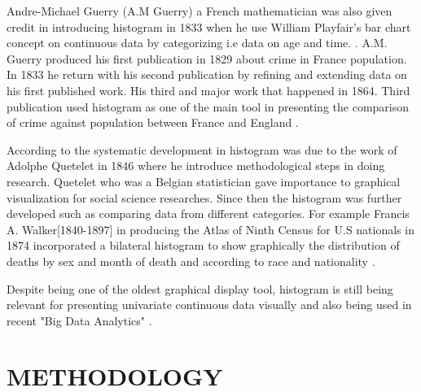 Andre-Michael Guerry (A.M Guerry) a French mathematician was also given credit in introducing histogram in 1833 when he use William Playfair's bar chart concept on continuous data by categorizing i.e data on age and time. \cite[]{beniger1976history,friendly2007m,ross2010introductory}. A.M. Guerry produced his first publication in 1829 about crime in France population. In 1833 he return with his second publication by refining and extending data on his first published work. His third and major work that happened in 1864. Third publication used histogram as one of the main tool in presenting the comparison of crime against population between France and England \cite[]{friendly2007m}.

According to \cite[]{ross2010introductory} the systematic development in histogram was due to the work of Adolphe Quetelet in 1846 where he introduce methodological steps in doing research. Quetelet who was a Belgian statistician gave importance to graphical visualization for social science researches. Since then the histogram was further developed such as comparing data from different categories. For example Francis A. Walker[1840-1897] in producing the Atlas of Ninth Census for U.S nationals in 1874 incorporated a bilateral histogram to show graphically the distribution of deaths by sex and month of death and according to race and nationality \cite[]{beniger1976history, friendly2008golden}. 

Despite being one of the oldest graphical display tool, histogram is still being relevant for presenting univariate continuous data  visually \cite[]{scott1979optimal, wand1997data} and also being used in recent "Big Data Analytics" \cite[]{berger2016big}.

\addblankpage %

\chapter{\textbf{METHODOLOGY}}\label{Introchap} 

